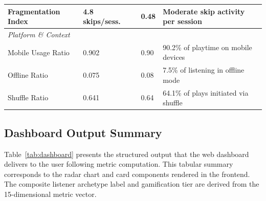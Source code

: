 \documentclass[conference]{IEEEtran}
\begin{document}
\begin{table}[ht]
\begin{tabular}{p{3.8cm} p{2.0cm} p{1.4cm} p{6.5cm}}
Fragmentation Index     & 4.8 skips/sess.\ & 0.48 & Moderate skip activity per session \\
\midrule
\multicolumn{4}{l}{\textit{Platform \& Context}} \\
Mobile Usage Ratio      & 0.902            & 0.90 & 90.2\% of playtime on mobile devices \\
Offline Ratio           & 0.075            & 0.08 & 7.5\% of listening in offline mode \\
Shuffle Ratio           & 0.641            & 0.64 & 64.1\% of plays initiated via shuffle \\
\bottomrule
\end{tabular}
\end{table}

\subsection{Dashboard Output Summary}

Table~\ref{tab:dashboard} presents the structured output that the web dashboard delivers to the user following metric computation. This tabular summary corresponds to the radar chart and card components rendered in the frontend. The composite listener archetype label and gamification tier are derived from the 15-dimensional metric vector.
\end{document}
